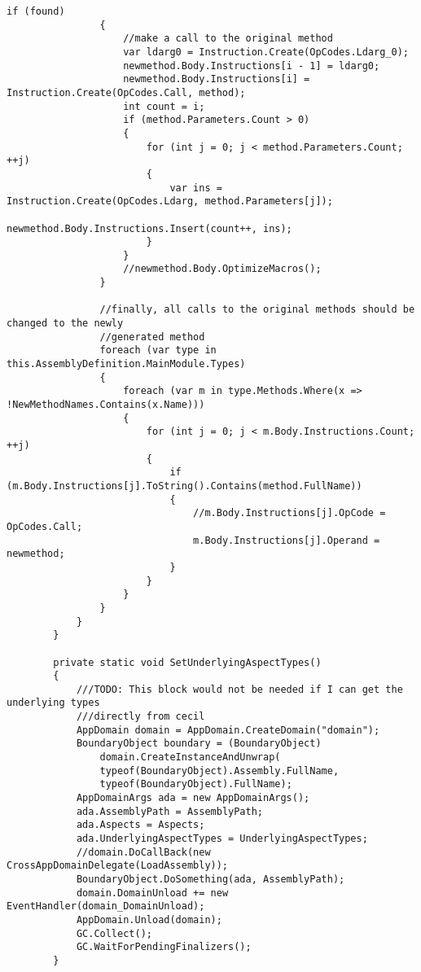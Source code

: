 \begin{lstlisting}[caption={../buffalo/Weaver.cs}, label=../buffalo/Weaver.cs, frame=tb, basicstyle=\scriptsize]
                if (found)
                {
                    //make a call to the original method
                    var ldarg0 = Instruction.Create(OpCodes.Ldarg_0);
                    newmethod.Body.Instructions[i - 1] = ldarg0;
                    newmethod.Body.Instructions[i] = Instruction.Create(OpCodes.Call, method);
                    int count = i;
                    if (method.Parameters.Count > 0)
                    {
                        for (int j = 0; j < method.Parameters.Count; ++j)
                        {
                            var ins = Instruction.Create(OpCodes.Ldarg, method.Parameters[j]);
                            newmethod.Body.Instructions.Insert(count++, ins);
                        }
                    }
                    //newmethod.Body.OptimizeMacros();
                }

                //finally, all calls to the original methods should be changed to the newly
                //generated method
                foreach (var type in this.AssemblyDefinition.MainModule.Types)
                {
                    foreach (var m in type.Methods.Where(x => !NewMethodNames.Contains(x.Name)))
                    {
                        for (int j = 0; j < m.Body.Instructions.Count; ++j)
                        {
                            if (m.Body.Instructions[j].ToString().Contains(method.FullName))
                            {
                                //m.Body.Instructions[j].OpCode = OpCodes.Call;
                                m.Body.Instructions[j].Operand = newmethod;
                            }
                        }
                    }
                }
            }
        }
        
        private static void SetUnderlyingAspectTypes()
        {
            ///TODO: This block would not be needed if I can get the underlying types
            ///directly from cecil
            AppDomain domain = AppDomain.CreateDomain("domain");
            BoundaryObject boundary = (BoundaryObject)
                domain.CreateInstanceAndUnwrap(
                typeof(BoundaryObject).Assembly.FullName,
                typeof(BoundaryObject).FullName);
            AppDomainArgs ada = new AppDomainArgs();
            ada.AssemblyPath = AssemblyPath;
            ada.Aspects = Aspects;
            ada.UnderlyingAspectTypes = UnderlyingAspectTypes;
            //domain.DoCallBack(new CrossAppDomainDelegate(LoadAssembly));
            BoundaryObject.DoSomething(ada, AssemblyPath);
            domain.DomainUnload += new EventHandler(domain_DomainUnload);
            AppDomain.Unload(domain);
            GC.Collect();
            GC.WaitForPendingFinalizers();
        }


\end{lstlisting}
